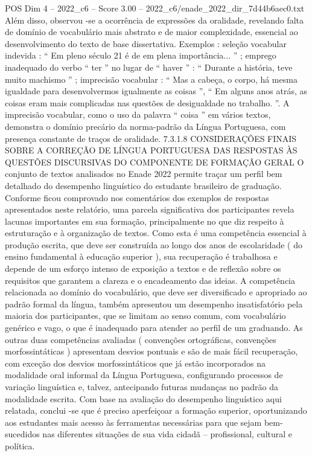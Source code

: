 \begin{textsample}{POS Dim 4 – 2022\_c6 – Score 3.00 – 2022\_c6/enade\_2022\_dir\_7d44b6aec0.txt}
Além disso, observou -se a ocorrência de expressões da oralidade, revelando falta de domínio de vocabulário mais abstrato e de maior complexidade, essencial ao desenvolvimento do texto de base dissertativa.
Exemplos : seleção vocabular indevida : “ Em pleno século 21 é de em plena importância... ” ; emprego inadequado do verbo “ ter ” no lugar de “ haver ” : “ Durante a história, teve muito machismo ” ; imprecisão vocabular : “ Mas a cabeça, o corpo, há mesma igualdade para desenvolvermos igualmente as coisas ”, “ Em alguns anos atrás, as coisas eram mais complicadas nas questões de desigualdade no trabalho. ”.
A imprecisão vocabular, como o uso da palavra “ coisa ” em vários textos, demonstra o domínio precário da norma-padrão da Língua Portuguesa, com presença constante de traços de oralidade. 7.3.1.8 CONSIDERAÇÕES FINAIS SOBRE A CORREÇÃO DE LÍNGUA PORTUGUESA DAS RESPOSTAS ÀS QUESTÕES DISCURSIVAS DO COMPONENTE DE FORMAÇÃO GERAL O conjunto de textos analisados no Enade 2022 permite traçar um perfil bem detalhado do desempenho linguístico do estudante brasileiro de graduação.
Conforme ficou comprovado nos comentários dos exemplos de respostas apresentados neste relatório, uma parcela significativa dos participantes revela lacunas importantes em sua formação, principalmente no que diz respeito à estruturação e à organização de textos.
Como esta é uma competência essencial à produção escrita, que deve ser construída ao longo dos anos de escolaridade ( do ensino fundamental à educação superior ), sua recuperação é trabalhosa e depende de um esforço intenso de exposição a textos e de reflexão sobre os requisitos que garantem a clareza e o encadeamento das ideias.
A competência relacionada ao domínio do vocabulário, que deve ser diversificado e apropriado ao padrão formal da língua, também apresentou um desempenho insatisfatório pela maioria dos participantes, que se limitam ao senso comum, com vocabulário genérico e vago, o que é inadequado para atender ao perfil de um graduando.
As outras duas competências avaliadas ( convenções ortográficas, convenções morfossintáticas ) apresentam desvios pontuais e são de mais fácil recuperação, com exceção dos desvios morfossintáticos que já estão incorporados na modalidade oral informal da Língua Portuguesa, configurando processos de variação linguística e, talvez, antecipando futuras mudanças no padrão da modalidade escrita.
Com base na avaliação do desempenho linguístico aqui relatada, conclui -se que é preciso aperfeiçoar a formação superior, oportunizando aos estudantes mais acesso às ferramentas necessárias para que sejam bem-sucedidos nas diferentes situações de sua vida cidadã – profissional, cultural e política.

\end{textsample}
